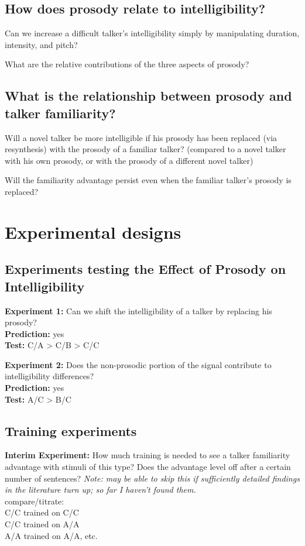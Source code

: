 \subsection{How does prosody relate to intelligibility?}
\begin{itm}
	\item{Can we increase a difficult talker’s intelligibility simply by manipulating duration, intensity, and pitch?}
	\item{What are the relative contributions of the three aspects of prosody?}
\end{itm}

\subsection{What is the relationship between prosody and talker familiarity?}
\begin{itm}
	\item{Will a novel talker be more intelligible if his prosody has been replaced (via resynthesis) with the prosody of a familiar talker?  (compared to a novel talker with his own prosody, or with the prosody of a different novel talker)}
	\item{Will the familiarity advantage persist even when the familiar talker’s prosody is replaced?}
\end{itm}


\section{Experimental designs}
\subsection{Experiments testing the Effect of Prosody on Intelligibility}
{\bfseries Experiment 1:} Can we shift the intelligibility of a talker by replacing his prosody?\\
{\bfseries Prediction:} yes\\
{\bfseries Test:} C/A > C/B > C/C

{\bfseries Experiment 2:} Does the non-prosodic portion of the signal contribute to intelligibility differences?\\
{\bfseries Prediction:} yes\\
{\bfseries Test:} A/C > B/C 

\subsection{Training experiments}
{\bfseries Interim Experiment:} How much training is needed to see a talker familiarity advantage with stimuli of this type?  Does the advantage level off after a certain number of sentences? \textit{Note: may be able to skip this if sufficiently detailed findings in the literature turn up; so far I haven’t found them.}\\compare/titrate:\\C/C trained on C/C\\C/C trained on A/A\\A/A trained on A/A, etc.

